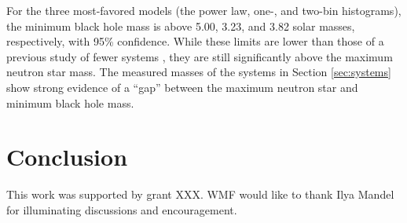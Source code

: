 \documentclass[preprint]{aastex}
\begin{document}
For the three most-favored models (the power law, one-, and two-bin
histograms), the minimum black hole mass is above 5.00, 3.23, and 3.82
solar masses, respectively, with 95\% confidence.  While these limits
are lower than those of a previous study of fewer systems
\citep{Bailyn1998}, they are still significantly above the maximum
neutron star mass.  The measured masses of the systems in Section
\ref{sec:systems} show strong evidence of a ``gap'' between the
maximum neutron star and minimum black hole mass.

\section{Conclusion}

\acknowledgements

This work was supported by grant XXX.  WMF would like to thank Ilya
Mandel for illuminating discussions and encouragement.


\end{document}
